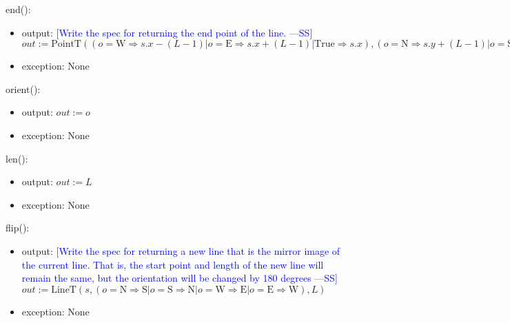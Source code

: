 \documentclass[12pt]{article}
\newcommand{\authornote}[3]{\textcolor{#1}{[#3 ---#2]}}
\newcommand{\authornote}[3]{}
\newcommand{\wss}[1]{\authornote{blue}{SS}{#1}}
\begin{document}
\noindent end():
\begin{itemize}
\item output: \wss{Write the spec for returning the end point of the
    line.}$out := \mbox{PointT}((o = \mbox{W} \Rightarrow s.x - (L-1) | o =
  \mbox{E} \Rightarrow s.x + (L-1) | \mbox{True} \Rightarrow s.x), (o = \mbox{N}
  \Rightarrow s.y + (L-1) | o = \mbox{S} \Rightarrow s.y - (L-1) | \mbox{True}
  \Rightarrow s.y))$

\item exception: None
\end{itemize}

\noindent orient():
\begin{itemize}
\item output: $out := o$
\item exception: None
\end{itemize}

\noindent len():
\begin{itemize}
\item output: $out := L$
\item exception: None
\end{itemize}

\noindent flip():
\begin{itemize}
\item output: \wss{Write the spec for returning a new line that is the mirror
    image of the current line.  That is, the start point and length of the new
    line will remain the same, but the orientation will be changed by 180
    degrees}$out := \mbox{LineT}(s, (o = \mbox{N} \Rightarrow \mbox{S} | o =
  \mbox{S} \Rightarrow \mbox{N} | o = \mbox{W} \Rightarrow \mbox{E} | o =
  \mbox{E} \Rightarrow \mbox{W}), L)$
\item exception: None
\end{itemize}
\end{document}
